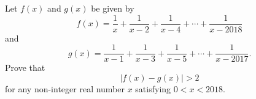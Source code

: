 Let $f(x)$ and $g(x)$ be given by \[f(x) = \frac{1}{x} + \frac{1}{x-2} + \frac{1}{x-4} + \cdots + \frac{1}{x-2018}\] and \[g(x) = \frac{1}{x-1} + \frac{1}{x-3} + \frac{1}{x-5} + \cdots + \frac{1}{x-2017}.\] Prove that \[|f(x)-g(x)| >2\] for any non-integer real number $x$ satisfying $0 < x < 2018$.